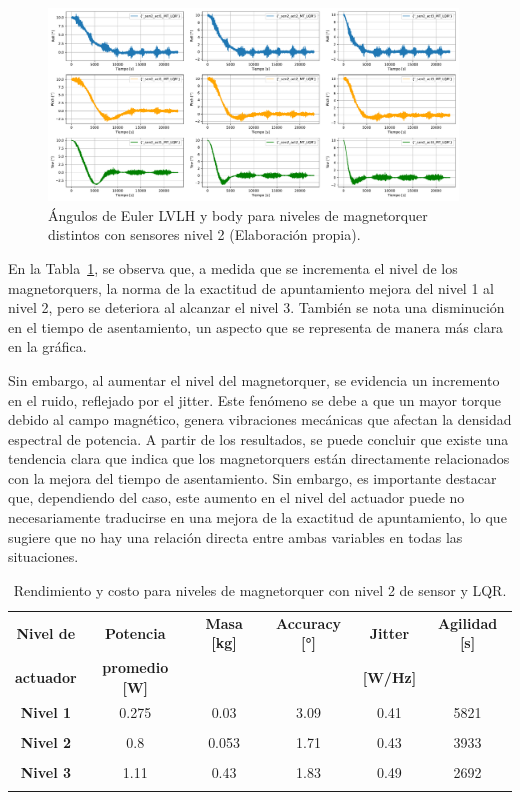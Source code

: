 \begin{figure}[H]
	\centering    
	\includegraphics[width=0.97\textwidth]{MT_LQR_actuadores.pdf}
	\caption{Ángulos de Euler LVLH y body para niveles de magnetorquer distintos con sensores nivel 2 (Elaboración propia).}
	\label{fig:MT_LQR_actuadores}
\end{figure}

En la Tabla~\ref{tab:MT_LQR_actuadores}, se observa que, a medida que se incrementa el nivel de los magnetorquers, la norma de la exactitud de apuntamiento mejora del nivel 1 al nivel 2, pero se deteriora al alcanzar el nivel 3. También se nota una disminución en el tiempo de asentamiento, un aspecto que se representa de manera más clara en la gráfica.

Sin embargo, al aumentar el nivel del magnetorquer, se evidencia un incremento en el ruido, reflejado por el jitter. Este fenómeno se debe a que un mayor torque debido al campo magnético, genera vibraciones mecánicas que afectan la densidad espectral de potencia. A partir de los resultados, se puede concluir que existe una tendencia clara que indica que los magnetorquers están directamente relacionados con la mejora del tiempo de asentamiento. Sin embargo, es importante destacar que, dependiendo del caso, este aumento en el nivel del actuador puede no necesariamente traducirse en una mejora de la exactitud de apuntamiento, lo que sugiere que no hay una relación directa entre ambas variables en todas las situaciones.

\begin{table}[h!]
	\centering
	\caption{Rendimiento y costo para niveles de magnetorquer con nivel 2 de sensor y LQR.}
	\begin{tabular}{|c|c|c|c|c|c|}
		\hline
		\textbf{Nivel de}   & \textbf{Potencia} & \textbf{Masa [kg]} & \textbf{Accuracy [°]} & \textbf{Jitter} & \textbf{Agilidad [s]}  \\ 
		\textbf{actuador}  & \textbf{promedio [W]} & & & \textbf{[W/Hz]} &  \\
		\hline
		\textbf{Nivel 1}   & 0.275  &  0.03  & 3.09 &  0.41 & 5821   \\
		&  &   &  &  &    \\
		\hline
		\textbf{Nivel 2}   & 0.8  & 0.053  & 1.71 & 0.43 & 3933   \\
		& & & & &   \\
		\hline
		\textbf{Nivel 3}   & 1.11  & 0.43  & 1.83 & 0.49 & 2692   \\
		& & & & &   \\
		\hline		
	\end{tabular}
	\label{tab:MT_LQR_actuadores}
\end{table}

